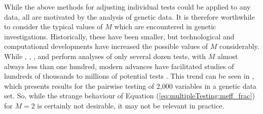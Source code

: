 \documentclass[letterpaper,12pt,oneside,final]{article}
\newcommand{\comment}[1]{{\color{steelblue} COMMENT:  {#1}}}
\begin{document}

While the above methods for adjusting individual tests could be applied to any data, all are motivated by the analysis of genetic data. It is therefore worthwhile to consider the typical values of $M$ which are encountered in genetic investigations. Historically, these have been smaller, but technological and computational developments have increased the possible values of $M$ considerably. While \cite{LanderBotstein1989}, \cite{cheverud2001}, \cite{nyholt2004}, and \cite{LiJi2005} perform analyses of only several dozen tests, with $M$ almost always less than one hundred, modern advances have facilitated studies of hundreds of thousands to millions of potential tests \cite{laframboise2009}. This trend can be seen in \cite{Galwey2009}, which presents results for the pairwise testing of 2,000 variables in a genetic data set. So, while the strange behaviour of Equation (\ref{eq:multipleTesting:meff_frac}) for $M=2$ is certainly not desirable, it may not be relevant in practice.
\end{document}
